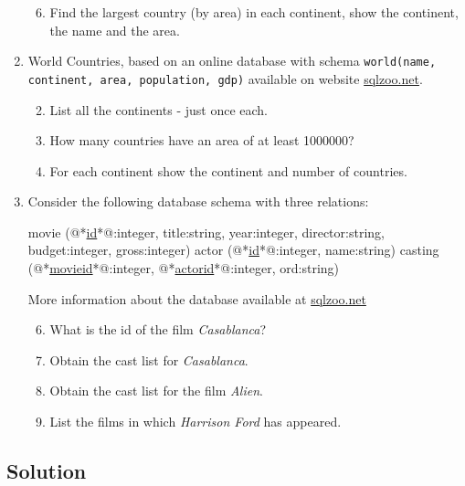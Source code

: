 \begin{enumerate}
\begin{enumerate}
\setcounter{enumii}{5}
\item
Find the largest country (by area) in each continent, show the continent, the name and the area.

\end{enumerate}

\item
World Countries, based on an online database with schema \texttt{world(name, continent, area, population, gdp)} available on website \href{http://sqlzoo.net/wiki/SUM_and_COUNT}{sqlzoo.net}.

\begin{enumerate}

\setcounter{enumii}{1}
\item
List all the continents - just once each.

\setcounter{enumii}{3}
\item
How many countries have an area of at least 1000000?

\setcounter{enumii}{5}
\item
For each continent show the continent and number of countries.

\end{enumerate}

\item
Consider the following database schema with three relations:

\begin{terminal}
movie (@*\underline{id}*@:integer, title:string, year:integer, director:string, budget:integer, gross:integer)
actor (@*\underline{id}*@:integer, name:string)
casting (@*\underline{movieid}*@:integer, @*\underline{actorid}*@:integer, ord:string)
\end{terminal}

More information about the database available at \href{http://sqlzoo.net/wiki/More_details_about_the_database.}{sqlzoo.net}

\begin{enumerate}

\setcounter{enumii}{5}
\item
What is the id of the film \textit{Casablanca}?

\item
Obtain the cast list for \textit{Casablanca}.

\item
Obtain the cast list for the film \textit{Alien}.

\item
List the films in which \textit{Harrison Ford} has appeared.

\end{enumerate}

\end{enumerate}

\subsection*{Solution}

\lstset{language=sql}

